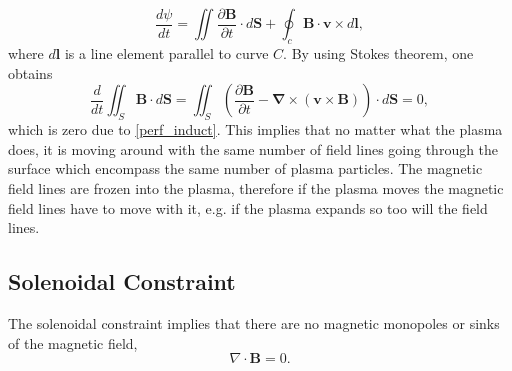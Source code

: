 \documentclass[12pt]{ociamthesis}
\newcommand{\bs}[1]{\boldsymbol{#1}}
\newcommand{\bn}{\boldsymbol{\nabla}}
\begin{document}
\begin{equation}
    \frac{d \psi}{ dt} = \iint \frac{\partial \bs{B}}{ \partial t} \cdot d\bs{S} + \oint_c  \bs{B} \cdot \bs{v} \times d\bs{l},
\end{equation}
where $d\bs{l}$ is a line element parallel to curve $C$. By using Stokes theorem, one obtains
\begin{equation}
    \frac{d}{dt} \iint_S \bs{B} \cdot d \bs{S} = \iint_S \left( \frac{\partial \boldsymbol{B}}{\partial t} - \bn \times (\boldsymbol{v} \times \boldsymbol{B})  \right) \cdot d\bs{S} = 0, 
\end{equation}
which is zero due to \eqref{perf_induct}. This implies that no matter what the plasma does, it is moving around with the same number of field lines going through the surface which encompass the same number of plasma particles. The magnetic field lines are frozen into the plasma, therefore if the plasma moves the magnetic field lines have to move with it, e.g. if the plasma expands so too will the field lines.
\subsection{Solenoidal Constraint}
\label{section:cont_eq}
The solenoidal constraint implies that there are no magnetic monopoles or sinks of the magnetic field,
\begin{equation}\label{eq90}
\nabla \cdot \boldsymbol{B} = 0.
\end{equation}
\end{document}

